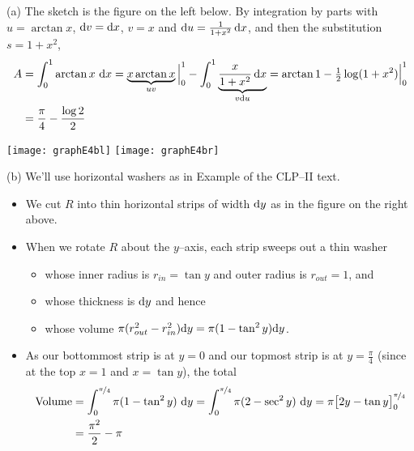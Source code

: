 \begin{solution} (a) The sketch is the figure on  the left below.
By integration by parts with $u=\arctan x$, $\mathrm{d}v=\mathrm{d}x$,  $v=x$ and $\mathrm{d}u=\frac{1}{1+x^2}\,\mathrm{d}x$, and then the substitution $s=1+x^2$,
\begin{align*}
A&=\int_0^1\arctan x\ \mathrm{d}x=\underbrace{ x\arctan x}_{uv}\Big|_0^1-\int_0^1\underbrace{\frac{x}{1+x^2}\,\mathrm{d}x}_{v\mathrm{d}u}
=\arctan 1-\tfrac{1}{2}\log(1+x^2)\Big|_0^1\\
&=\frac{\pi}{4}-\frac{\log 2}{2}
\end{align*}

\begin{center}
       \texttt{[image: graphE4bl]}\qquad
       \texttt{[image: graphE4br]}
\end{center}

\noindent (b)
We'll use horizontal washers as in Example  
of the %
CLP--II text.
 \begin{itemize}
\item We cut $R$ into thin horizontal  strips of width $\mathrm{d}y$ as in
the figure on the right above.

\item When we rotate $R$ about the $y$--axis, each strip sweeps out a thin
washer
\begin{itemize}
\item whose inner radius is $r_{in}=\tan y$ and outer radius is $r_{out}=1$, and
\item whose thickness is $\mathrm{d}y$ and hence
\item whose volume $\pi(r_{out}^2 - r_{in}^2)\mathrm{d}y = \pi(1-\tan^2 y)\mathrm{d}y$.
\end{itemize}
\item As our bottommost strip is at $y=0$ and our topmost
strip is at $y=\frac{\pi}{4}$ (since at the top $x=1$ and $x=\tan y$), the total
\begin{align*}
\text{Volume}
&= \int _0^{\nicefrac{\pi}{4}} \pi(1-\tan^2 y)\ \mathrm{d}y
= \int _0^{\nicefrac{\pi}{4}} \pi(2-\sec^2 y)\ \mathrm{d}y
=\pi\big[2y -\tan y\big]_0^{\nicefrac{\pi}{4}} \\
&= \frac{\pi^2}{2}-\pi
\end{align*}
\end{itemize}
\end{solution}


